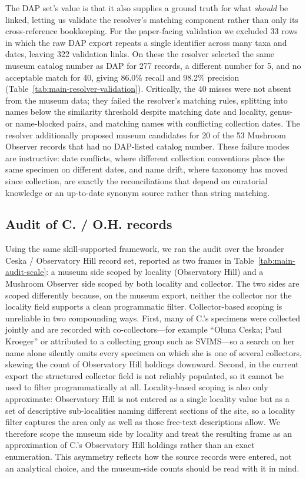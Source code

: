 The DAP set's value is that it also supplies a ground truth for what \emph{should}
be linked, letting us validate the resolver's matching component rather than only
its cross-reference bookkeeping. For the paper-facing validation we excluded 33
rows in which the raw DAP export repeats a single identifier across many taxa and
dates, leaving 322 validation links. On these the resolver selected the same
museum catalog number as DAP for 277 records, a different number for 5, and no
acceptable match for 40, giving 86.0\% recall and 98.2\% precision
(Table~\ref{tab:main-resolver-validation}). Critically, the 40 misses were not
absent from the museum data; they failed the resolver's matching rules, splitting
into names below the similarity threshold despite matching date and locality,
genus- or name-blocked pairs, and matching names with conflicting collection
dates.
The resolver additionally proposed museum candidates for 20 of the 53 Mushroom
Observer records that had no DAP-listed catalog number. These failure modes are
instructive: date conflicts, where different collection conventions place the same
specimen on different dates, and name drift, where taxonomy has moved since
collection, are exactly the reconciliations that depend on curatorial knowledge or
an up-to-date synonym source rather than string matching.

\subsection{Audit of C. / O.H. records}

Using the same skill-supported framework, we ran the audit over the broader
Ceska / Observatory Hill record set, reported as two frames in
Table~\ref{tab:main-audit-scale}: a museum side scoped by locality (Observatory
Hill) and a Mushroom Observer side scoped by both locality and collector. The two
sides are scoped differently because, on the museum export, neither the collector
nor the locality field supports a clean programmatic filter. Collector-based
scoping is unreliable in two compounding ways. First, many of C.'s specimens were
collected jointly and are recorded with co-collectors---for example ``Oluna Ceska;
Paul Kroeger'' or attributed to a collecting group such as SVIMS---so a search on
her name alone silently omits every specimen on which she is one of several
collectors, skewing the count of Observatory Hill holdings downward. Second, in the
current export the structured collector field is not reliably populated, so it
cannot be used to filter programmatically at all. Locality-based scoping is also
only approximate: Observatory Hill is not entered as a single locality value but as
a set of descriptive sub-localities naming different sections of the site, so a
locality filter captures the area only as well as those free-text descriptions
allow. We therefore scope the museum side by locality and treat the resulting frame
as an approximation of C.'s Observatory Hill holdings rather than an exact
enumeration. This asymmetry reflects how the source records were entered, not an
analytical choice, and the museum-side counts should be read with it in mind.

